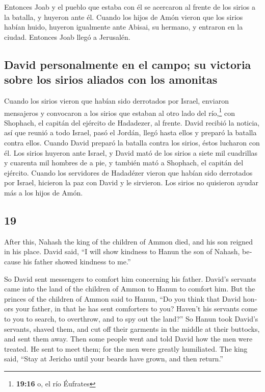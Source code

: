 \begin{paracol}{2}
 Entonces Joab y el pueblo que estaba con él se acercaron
al frente de los sirios a la batalla, y huyeron ante él. 
Cuando los hijos de Amón vieron que los sirios habían huido, huyeron
igualmente ante Abisai, su hermano, y entraron en la ciudad. Entonces
Joab llegó a Jerusalén.

\hypertarget{david-personalmente-en-el-campo-su-victoria-sobre-los-sirios-aliados-con-los-amonitas}{%
\subsection{David personalmente en el campo; su victoria sobre los
sirios aliados con los
amonitas}\label{david-personalmente-en-el-campo-su-victoria-sobre-los-sirios-aliados-con-los-amonitas}}

 Cuando los sirios vieron que habían sido derrotados por
Israel, enviaron mensajeros y convocaron a los sirios que estaban al
otro lado del río,\footnote{\textbf{19:16} o, el río Éufrates} con
Shophach, el capitán del ejército de Hadadezer, al frente.
 David recibió la noticia, así que reunió a todo Israel,
pasó el Jordán, llegó hasta ellos y preparó la batalla contra ellos.
Cuando David preparó la batalla contra los sirios, éstos lucharon con
él.  Los sirios huyeron ante Israel, y David mató de los
sirios a siete mil cuadrillas y cuarenta mil hombres de a pie, y también
mató a Shophach, el capitán del ejército.  Cuando los
servidores de Hadadézer vieron que habían sido derrotados por Israel,
hicieron la paz con David y le sirvieron. Los sirios no quisieron ayudar
más a los hijos de Amón.

\switchcolumn
\begin{otherlanguage}{english}

\hypertarget{section-37}{%
\section{19}\label{section-37}}

 After this, Nahash the king of the children of Ammon
died, and his son reigned in his place.  David said, ``I
will show kindness to Hanun the son of Nahash, because his father showed
kindness to me.''

So David sent messengers to comfort him concerning his father. David's
servants came into the land of the children of Ammon to Hanun to comfort
him.  But the princes of the children of Ammon said to
Hanun, ``Do you think that David honors your father, in that he has sent
comforters to you? Haven't his servants come to you to search, to
overthrow, and to spy out the land?''  So Hanun took
David's servants, shaved them, and cut off their garments in the middle
at their buttocks, and sent them away.  Then some people
went and told David how the men were treated. He sent to meet them; for
the men were greatly humiliated. The king said, ``Stay at Jericho until
your beards have grown, and then return.''


\end{otherlanguage}
\end{paracol}
